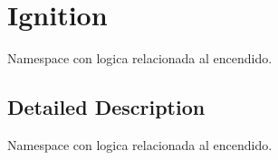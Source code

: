 \hypertarget{group__Ignition}{}\section{Ignition}
\label{group__Ignition}


Namespace con logica relacionada al encendido.  




\subsection{Detailed Description}
Namespace con logica relacionada al encendido. 

